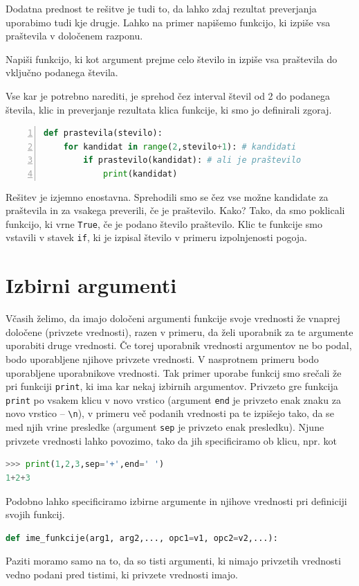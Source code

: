 Dodatna prednost te rešitve je tudi to, da lahko zdaj rezultat preverjanja uporabimo tudi kje drugje. Lahko na primer napišemo funkcijo, ki izpiše vsa praštevila v določenem razponu.
\begin{zgled}
Napiši funkcijo, ki kot argument prejme celo število in izpiše vsa praštevila do vključno podanega števila.
\end{zgled}
\begin{resitev}
Vse kar je potrebno narediti, je sprehod čez interval števil od 2 do podanega števila, klic in preverjanje rezultata klica funkcije, ki smo jo definirali zgoraj.
\begin{lstlisting}[language=Python,numbers=left]
def prastevila(stevilo):
    for kandidat in range(2,stevilo+1): # kandidati
        if prastevilo(kandidat): # ali je praštevilo
            print(kandidat)
\end{lstlisting}
\end{resitev}
Rešitev je izjemno enostavna. Sprehodili smo se čez vse možne kandidate za praštevila in za vsakega preverili, če je praštevilo. Kako? Tako, da smo poklicali funkcijo, ki vrne \texttt{True}, če je podano število praštevilo. Klic te funkcije smo vstavili v stavek \texttt{if}, ki je izpisal število v primeru izpolnjenosti pogoja.

\section{Izbirni argumenti}
Včasih želimo, da imajo določeni argumenti funkcije svoje vrednosti že vnaprej določene (privzete vrednosti), razen v primeru, da želi uporabnik za te argumente uporabiti druge vrednosti. Če torej uporabnik vrednosti argumentov ne bo podal, bodo uporabljene njihove privzete vrednosti. V nasprotnem primeru bodo uporabljene uporabnikove vrednosti. Tak primer uporabe funkcij smo srečali že pri funkciji \texttt{print}, ki ima kar nekaj izbirnih argumentov. Privzeto gre funkcija \texttt{print} po vsakem klicu v novo vrstico (argument \texttt{end} je privzeto enak znaku za novo vrstico -- \texttt{\textbackslash n}), v primeru več podanih vrednosti pa te izpišejo tako, da se med njih vrine presledke (argument \texttt{sep} je privzeto enak presledku). Njune privzete vrednosti lahko povozimo, tako da jih specificiramo ob klicu, npr. kot
\begin{lstlisting}[language=Python]
>>> print(1,2,3,sep='+',end=' ')
1+2+3
\end{lstlisting}
Podobno lahko specificiramo izbirne argumente in njihove vrednosti pri definiciji svojih funkcij. 
\begin{lstlisting}[language=Python]
def ime_funkcije(arg1, arg2,..., opc1=v1, opc2=v2,...):
\end{lstlisting}
Paziti moramo samo na to, da so tisti argumenti, ki nimajo privzetih vrednosti vedno podani pred tistimi, ki privzete vrednosti imajo.

